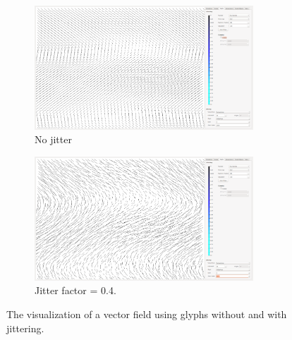 \begin{figure}[tbh]
	\centering
	\begin{subfigure}{0.45\textwidth}
		\centering
		\includegraphics[width=0.9\textwidth, trim={35px 30px 430px 30px}, clip]{img/glyphs/nojitter}
		\caption{No jitter}
		\label{fig:jitter:nojitter}
	\end{subfigure}
	\hspace{30px}
	\begin{subfigure}{0.45\textwidth}	
		\centering
		\includegraphics[width=0.9\textwidth, trim={35px 30px 430px 30px}, clip]{img/glyphs/jitter_0.4}
		\caption{Jitter factor = 0.4.}
		\label{fig:jitter:jitter}
	\end{subfigure}
	\caption{The visualization of a vector field using glyphs  without and  with jittering.}
	\label{fig:jitter}
\end{figure}

